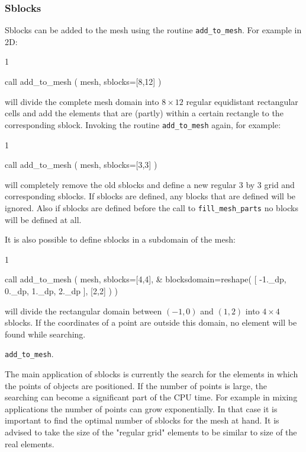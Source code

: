 \subsubsection{Sblocks}

Sblocks can be added to the mesh
using the routine \texttt{add\_to\_mesh}. For example in 2D:
\begin{listing}{1}

  call add_to_mesh ( mesh, sblocks=[8,12] )

\end{listing}
will divide the complete mesh domain into $8\times12$ regular equidistant
rectangular cells and add the
elements that are (partly) within a certain rectangle to the corresponding
sblock. Invoking the routine \texttt{add\_to\_mesh} again, for example:
\begin{listing}{1}

  call add_to_mesh ( mesh, sblocks=[3,3] )

\end{listing}
will completely remove the old sblocks and define a new regular 3 by 3 grid
and corresponding sblocks.
If sblocks are defined, any blocks that are defined will be ignored.
Also if sblocks are defined 
before the call to \texttt{fill\_mesh\_parts} no blocks will be defined at all.

It is also possible to define sblocks in a subdomain of the mesh:
\begin{listing}{1}

  call add_to_mesh ( mesh, sblocks=[4,4], &
    blocksdomain=reshape( [ -1._dp, 0._dp, 1._dp, 2._dp ], [2,2] )  )

\end{listing}
will divide the rectangular domain between $(-1,0)$ and $(1,2)$ into $4\times4$
sblocks. If the coordinates of a point are outside this domain, no element will
be found while searching.

 \texttt{add\_to\_mesh}.

The main application of sblocks is currently the search for the elements
in which
the points of objects are positioned. If the number of points is large, the
searching can become a significant part of the CPU time. For example in mixing
applications the number of points can grow exponentially. In that case it is
important to find the optimal number of sblocks for the mesh at hand.
It is advised to take the size of the "regular grid" elements to be similar
to size of the real elements.

